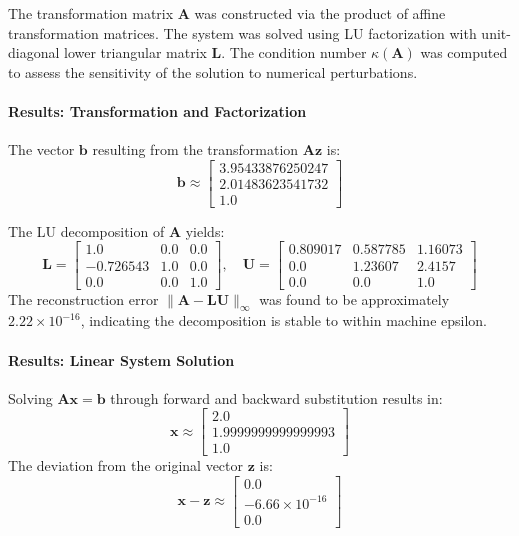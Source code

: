 \begin{solution}
  The transformation matrix $\mathbf{A}$ was constructed via the product of affine transformation matrices. The system was solved using LU factorization with unit-diagonal lower triangular matrix $\mathbf{L}$. The condition number $\kappa(\mathbf{A})$ was computed to assess the sensitivity of the solution to numerical perturbations.

  \paragraph{Results: Transformation and Factorization}
  The vector $\mathbf{b}$ resulting from the transformation $\mathbf{A}\mathbf{z}$ is:
  \[
  \mathbf{b} \approx \begin{bmatrix}
      3.95433876250247 \\
      2.01483623541732 \\
      1.0
  \end{bmatrix}
  \]

  The LU decomposition of $\mathbf{A}$ yields:
  \[
  \mathbf{L} = \begin{bmatrix}
      1.0 & 0.0 & 0.0 \\
      -0.726543 & 1.0 & 0.0 \\
      0.0 & 0.0 & 1.0
  \end{bmatrix}, \quad
  \mathbf{U} = \begin{bmatrix}
      0.809017 & 0.587785 & 1.16073 \\
      0.0 & 1.23607 & 2.4157 \\
      0.0 & 0.0 & 1.0
  \end{bmatrix}
  \]
  The reconstruction error $\|\mathbf{A} - \mathbf{LU}\|_{\infty}$ was found to be approximately $2.22 \times 10^{-16}$, indicating the decomposition is stable to within machine epsilon.

  \paragraph{Results: Linear System Solution}
  Solving $\mathbf{A}\mathbf{x} = \mathbf{b}$ through forward and backward substitution results in:
  \[
  \mathbf{x} \approx \begin{bmatrix}
      2.0 \\
      1.9999999999999993 \\
      1.0
  \end{bmatrix}
  \]
  The deviation from the original vector $\mathbf{z}$ is:
  \[
  \mathbf{x} - \mathbf{z} \approx \begin{bmatrix}
      0.0 \\
      -6.66 \times 10^{-16} \\
      0.0
  \end{bmatrix}
  \]


\end{solution}
